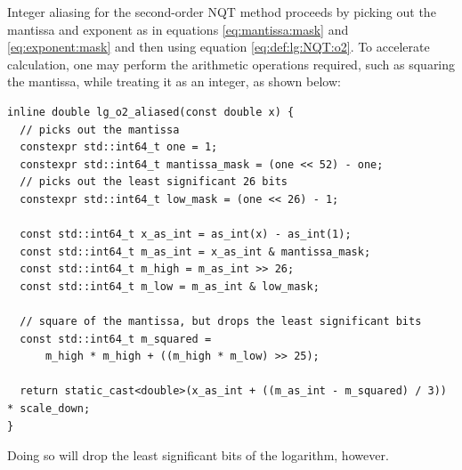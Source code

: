 \documentclass[linenumbers,twocolumn]{aastex631}
\begin{document}
Integer aliasing for the second-order NQT method proceeds by picking out the mantissa and exponent as in equations \eqref{eq:mantissa:mask} and \eqref{eq:exponent:mask} and then using equation \eqref{eq:def:lg:NQT:o2}. To accelerate calculation, one may perform the arithmetic operations required, such as squaring the mantissa, while treating it as an integer, as shown below:
\begin{nolinenumbers}
\begin{lstlisting}[caption={The integer-aliased NQTo2 log}, label={lst:nqto2}]
inline double lg_o2_aliased(const double x) {
  // picks out the mantissa
  constexpr std::int64_t one = 1;
  constexpr std::int64_t mantissa_mask = (one << 52) - one;
  // picks out the least significant 26 bits
  constexpr std::int64_t low_mask = (one << 26) - 1;

  const std::int64_t x_as_int = as_int(x) - as_int(1);
  const std::int64_t m_as_int = x_as_int & mantissa_mask;
  const std::int64_t m_high = m_as_int >> 26;
  const std::int64_t m_low = m_as_int & low_mask;
  
  // square of the mantissa, but drops the least significant bits
  const std::int64_t m_squared =
      m_high * m_high + ((m_high * m_low) >> 25);

  return static_cast<double>(x_as_int + ((m_as_int - m_squared) / 3)) * scale_down;
}
\end{lstlisting}
\end{nolinenumbers}
Doing so will drop the least significant bits of the logarithm, however.

{}



\end{document}
